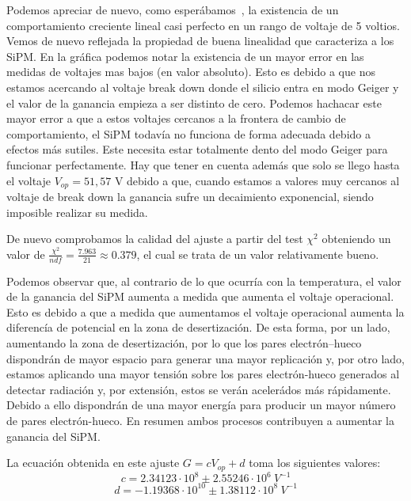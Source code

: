 \begin{itemize}
Podemos apreciar de nuevo, como esperábamos~\cite{tesisSiPM}, la existencia de un comportamiento creciente lineal casi perfecto en un rango de voltaje de 5 voltios. Vemos de nuevo reflejada la propiedad de buena linealidad que caracteriza a los SiPM. En la gráfica podemos notar la existencia de un mayor error en las medidas de voltajes mas bajos (en valor absoluto). Esto es debido a que nos estamos acercando al voltaje break down donde el silicio entra en modo Geiger y el valor de la ganancia empieza a ser distinto de cero. Podemos hachacar este mayor error a que a estos voltajes cercanos a la frontera de cambio de comportamiento, el SiPM todavía no funciona de forma adecuada debido a efectos más sutiles. Este necesita estar totalmente dento del modo Geiger para funcionar perfectamente. Hay que tener en cuenta además que solo se llego hasta el voltaje $V_{op}=51,57$ V debido a que, cuando estamos a valores muy cercanos al voltaje de break down la ganancia sufre un decaimiento exponencial, siendo imposible realizar su medida.

De nuevo comprobamos la calidad del ajuste a partir del test $\chi^2$ obteniendo un valor de $\frac{\chi^2}{ndf}=\frac{7.963}{21}\approx 0.379$, el cual se trata de un valor relativamente bueno.

Podemos observar que, al contrario de lo que ocurría con la temperatura, el valor de la ganancia del SiPM aumenta a medida que aumenta el voltaje operacional. Esto es debido a que a medida que aumentamos el voltaje operacional aumenta la diferencía de potencial en la zona de desertización. De esta forma, por un lado, aumentando la zona de desertización, por lo que los pares electrón--hueco dispondrán de mayor espacio para generar una mayor replicación y, por otro lado, estamos aplicando una mayor tensión sobre los pares electrón-hueco generados al detectar radiación y, por extensión, estos se verán acelerádos más rápidamente. Debido a ello dispondrán de una mayor energía para producir un mayor número de pares electrón-hueco. En resumen ambos procesos contribuyen a aumentar la ganancia del SiPM.

La ecuación obtenida en este ajuste $G=cV_{op}+d$ toma los siguientes valores: 
\begin{equation}
c=2.34123 \cdot 10^8 \pm 2.55246 \cdot 10^6~V^{-1}
\label{ajustependientevoltaje}
\end{equation}
\begin{equation}
d=-1.19368 \cdot 10^{10} \pm 1.38112 \cdot 10^8~V^{-1}
\label{ajusteordenadavoltaje}
\end{equation}


\end{itemize}
